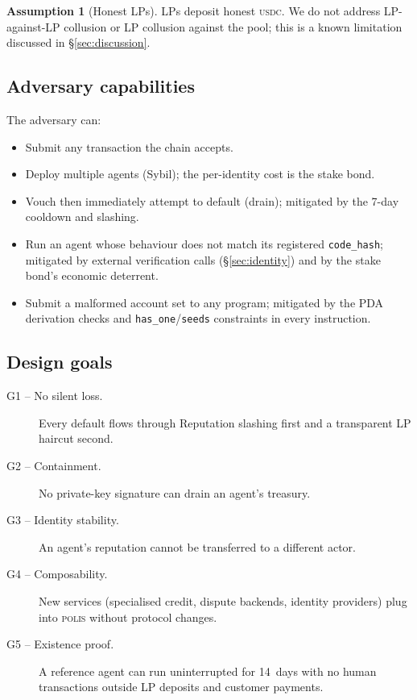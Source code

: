 \documentclass[10pt,conference,letterpaper]{IEEEtran}
\theoremstyle{definition}
\newtheorem{assumption}[theorem]{Assumption}
\newcommand{\polis}{\textsc{polis}\xspace}
\newcommand{\codehash}{\texttt{code\_hash}}
\newcommand{\USDC}{\textsc{usdc}}
\begin{document}
\begin{assumption}[Honest LPs]\label{ass:lp}
LPs deposit honest \USDC. We do not address LP-against-LP collusion or
LP collusion against the pool; this is a known limitation discussed in
\S\ref{sec:discussion}.
\end{assumption}

\subsection{Adversary capabilities}

The adversary can:
\begin{itemize}
\item Submit any transaction the chain accepts.
\item Deploy multiple agents (Sybil); the per-identity cost is the
stake bond.
\item Vouch then immediately attempt to default (drain); mitigated by
the 7-day cooldown and slashing.
\item Run an agent whose behaviour does not match its registered
\codehash; mitigated by external verification calls
(\S\ref{sec:identity}) and by the stake bond's economic deterrent.
\item Submit a malformed account set to any program; mitigated by the
PDA derivation checks and \texttt{has\_one}/\texttt{seeds} constraints
in every instruction.
\end{itemize}

\subsection{Design goals}

\begin{description}
\item[G1 -- No silent loss.] Every default flows through Reputation
slashing first and a transparent LP haircut second.
\item[G2 -- Containment.] No private-key signature can drain an agent's
treasury.
\item[G3 -- Identity stability.] An agent's reputation cannot be
transferred to a different actor.
\item[G4 -- Composability.] New services (specialised credit, dispute
backends, identity providers) plug into \polis without protocol
changes.
\item[G5 -- Existence proof.] A reference agent can run uninterrupted
for 14~days with no human transactions outside LP deposits and
customer payments.
\end{description}
\end{document}
